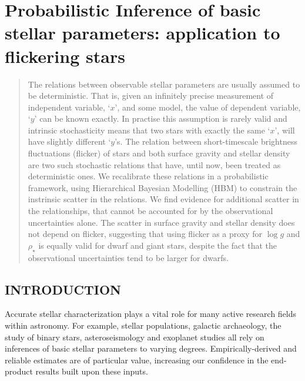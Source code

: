 \chapter{Probabilistic Inference of basic stellar parameters: application to
flickering stars}
\begin{abstract}

The relations between observable stellar parameters are usually assumed to be
deterministic.
That is, given an infinitely precise measurement of independent variable,
`$x$', and some model, the value of dependent variable, `$y$' can be known
exactly.
In practise this assumption is rarely valid and intrinsic stochasticity means
that two stars with exactly the same `$x$', will have slightly different
`$y$'s.
The relation between short-timescale brightness fluctuations (flicker) of
stars and both surface gravity \citep{bastien:2013} and stellar density
\citep{kipping:2014} are two such stochastic relations that have, until now,
been treated as deterministic ones.
We recalibrate these relations in a probabilistic framework, using
Hierarchical Bayesian Modelling (HBM) to constrain the instrinsic scatter in
the relations.
We find evidence for additional scatter in the relationships, that cannot be
accounted for by the observational uncertainties alone.
The scatter in surface gravity and stellar density does not depend on flicker,
suggesting that using flicker as a proxy for $\log g$ and $\rho_\star$ is
equally valid for dwarf and giant stars, despite the fact that the
observational uncertainties tend to be larger for dwarfs.

\end{abstract}

\section{INTRODUCTION}
\label{sec:intro}


Accurate stellar characterization plays a vital role for many active research
fields within astronomy. For example, stellar populations, galactic
archaeology, the study of binary stars, asteroseismology and exoplanet studies
all rely on inferences of basic stellar parameters to varying degrees.
Empirically-derived and reliable estimates are of particular value, increasing
our confidence in the end-product results built upon these inputs.

